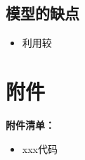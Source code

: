 \documentclass{my_paper}
\begin{document}
\subsection{模型的缺点}
\begin{itemize}
    \item 利用较

\end{itemize}

\newpage
\begin{center}
\end{center}

\newpage
\section{附件}
\textbf{附件清单：}
\begin{itemize}
    \item xxx代码
\end{itemize}
\end{document}
